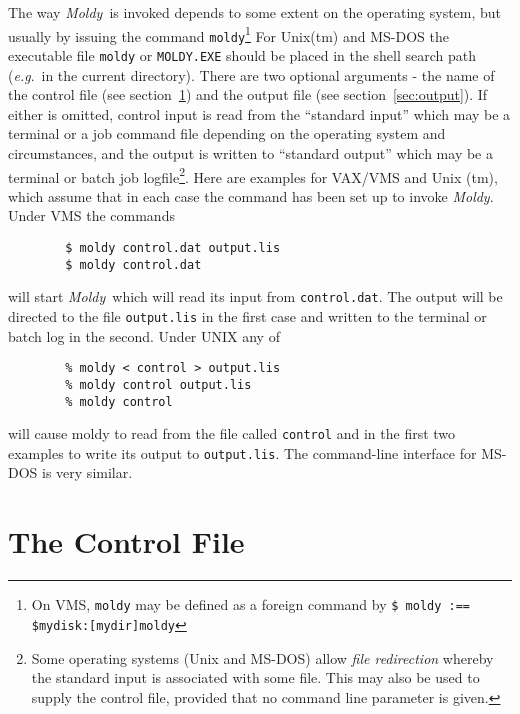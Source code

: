 \documentclass[twoside]{report}
\newcommand{\moldy}{{\em Moldy}}
\newcommand{\eg}{{\em e.g}.\ }
\begin{document}
The way \moldy\ is invoked depends to some extent on the operating
system, but usually by issuing the command \texttt{moldy}\footnote{On
VMS, {\tt moldy} may be defined as a foreign command by {\tt \$ moldy
:== \$mydisk:[mydir]moldy}} For Unix(tm) and MS-DOS the executable file
{\tt moldy} or {\tt MOLDY.EXE} should be placed in the shell search
path (\eg in the current directory). There
are two optional arguments - the name of the control file (see
section~\ref{sec:control}) and the output file (see
section~\ref{sec:output}).  If either is omitted, control input is
read from the ``standard input'' which may be a terminal or a job
command file depending on the operating system and circumstances, and
the output is written to ``standard output'' which may be a terminal
or batch job logfile\footnote{Some operating systems (Unix and MS-DOS)
allow {\em file redirection\/} whereby the standard input is
associated with some file.  This may also be used to supply the
control file, provided that no command line parameter is given.}.
Here are examples for VAX/VMS and Unix (tm), which assume that in 
each case the command has been set up to invoke \moldy. 
Under VMS the commands
\begin{verbatim}
        $ moldy control.dat output.lis
        $ moldy control.dat
\end{verbatim}
will start \moldy\  which will read its input from \texttt{control.dat}.
The output will be directed to the file \texttt{output.lis} in the first
case and written to the terminal or batch log in the second.  Under
UNIX any of
\begin{verbatim}
        % moldy < control > output.lis
        % moldy control output.lis
        % moldy control
\end{verbatim}
will cause moldy to read from the file called \texttt{control} and in
the first two examples to write its output to \texttt{output.lis}.  The
command-line interface for MS-DOS is very similar. 

\section{The Control File}%
\label{sec:control}
\end{document}
